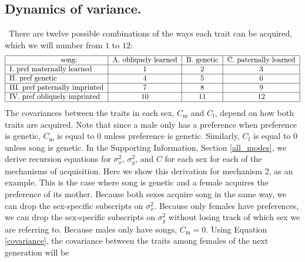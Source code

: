\documentclass[12pt]{article}
\newcommand{\x}[1]{\text{#1}}
\begin{document}
\subsection*{Dynamics of variance. }
\ There are twelve possible combinations of the ways each trait can be acquired, which we will number from $1$ to $12$: 
\newline
\begin{equation*}
\begin{tabular}{|l|c|c|c|}
\hline\ \ \ \ \ \ \ \ \ \ \ \ \ \ \ \ \ \ \ \ \ song:  & A. obliquely learned  & B. genetic & C.  paternally learned
\\\hline I. pref maternally learned & 1 & 2 & 3
\\\hline II. pref genetic & 4 & 5 & 6
\\\hline III. pref paternally imprinted & 7 & 8 & 9
\\\hline IV. pref obliquely imprinted & 10 & 11 & 12
\\\hline
\end{tabular}
\end{equation*}
\newline
The covariances between the traits in each sex, $C_\x{m}$ and $C_\x{f}$, depend on how both traits are acquired. Note that since a male only has a preference when preference is genetic, $C_\x{m}$ is equal to $0$ unless preference is genetic. Similarly, $C_\x{f}$ is equal to $0$ unless song is genetic.
In the Supporting Information, Section \ref{all_modes}, we derive recursion equations for $\sigma_x^2$, $\sigma_y^2$, and $C$ for each sex for each of the mechanisms of acquisition. Here we show this derivation for mechanism 2, as an example. This is the case where song is genetic and a female acquires the preference of its mother. Because both sexes acquire song in the same way, we can drop the sex-specific subscripts on $\sigma_x^2$. Because only females have preferences, we can drop the sex-specific subscripts on $\sigma_y^2$ without losing track of which sex we are referring to. Because males only have songs, $C_\x{m}=0$. Using Equation \ref{covariance}, the covariance between the traits among females of the next generation will be 
\end{document}

